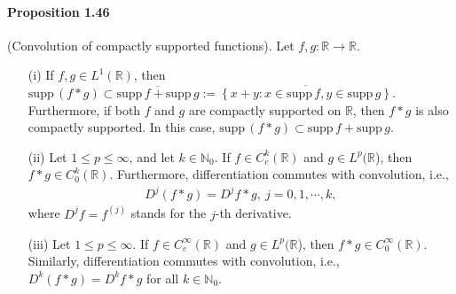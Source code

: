 \documentclass{article}
\newcommand{\supp}{\mathrm{supp}\,}
\begin{document}
\paragraph{Proposition 1.46\label{prop:1.46}} (Convolution of compactly supported functions). Let $f,g:\mathbb{R}\to\mathbb{R}$.
\begin{itemize}
	\item[(i)] If $f,g\in L^1(\mathbb{R})$, then $\supp(f*g)\subset\overline{\supp f + \supp g} := \overline{\left\{x+y:x\in\supp f,y\in\supp g\right\}}$. Furthermore, if both $f$ and $g$ are compactly supported on $\mathbb{R}$, then $f*g$ is also compactly supported. In this case, $\supp(f*g)\subset\supp f + \supp g$.
	\vspace{0.1cm}
    \item[(ii)] Let $1\leq p\leq \infty$, and let $k\in\mathbb{N}_0$. If $f\in C_c^k(\mathbb{R})$ and $g\in L^p(\mathbb{R}$), then $f * g\in C_0^k(\mathbb{R})$. Furthermore, differentiation commutes with convolution, i.e.,
    \begin{align*}
    	D^j(f*g)=D^j f * g,\ j=0,1,\cdots,k,
    \end{align*}
    where $D^j f= f^{(j)}$ stands for the $j$-th derivative.
    \vspace{0.1cm}
    \item[(iii)] Let $1\leq p\leq \infty$. If $f\in C_c^\infty(\mathbb{R})$ and $g\in L^p(\mathbb{R}$), then $f * g\in C_0^\infty(\mathbb{R})$. Similarly, differentiation commutes with convolution, i.e., $D^k(f * g)=D^k f * g$ for all $k\in\mathbb{N}_0$.
\end{itemize}
\end{document}
